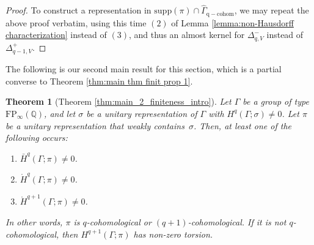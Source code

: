 \documentclass[12pt,reqno]{amsart}
\newcommand{\Q}{\mathbb{Q}}
\newtheorem{theorem}{Theorem}[section]
\theoremstyle{definition}
\newcommand{\torH}{\mathring{H}}
\begin{document}
\begin{proof}
    To construct a representation in $\mathrm{supp}(\pi) \cap \widehat{\Gamma}_{\mathrm{q-cohom}}$, we may repeat the above proof verbatim, using this time $(2)$ of Lemma \ref{lemma:non-Hausdorff characterization} instead of $(3)$, and thus an almost kernel for $\Delta_{q,V}^-$ instead of $\Delta_{q-1,V}^+$.\qedhere
    
\end{proof}
The following is our second main result for this section, which is a partial converse to Theorem \ref{thm:main thm finit prop 1}.

\begin{theorem}[Theorem \ref{thm:main_2_finiteness_intro}]\label{thm:main thm finit prop 2}
    Let $\Gamma$ be a group of type $\mathrm{FP}_\infty(\Q)$, and let $\sigma$ be a unitary representation of $\Gamma$ with $H^q(\Gamma;\sigma) \ne 0$. Let $\pi$ be a unitary representation that weakly contains~$\sigma$. Then, at least one of the following occurs:
    \begin{enumerate}
        \item  $\bar{H}^q(\Gamma;\pi) \ne 0$.
        \item  $\torH^q(\Gamma;\pi) \ne 0$.
        \item  $\torH^{q+1}(\Gamma;\pi) \ne 0$.
    \end{enumerate}
    In other words, $\pi$ is $q$-cohomological or $(q+1)$-cohomological. If it is not $q$-cohomological, then $H^{q+1}(\Gamma;\pi)$ has non-zero torsion.
\end{theorem}
\end{document}

